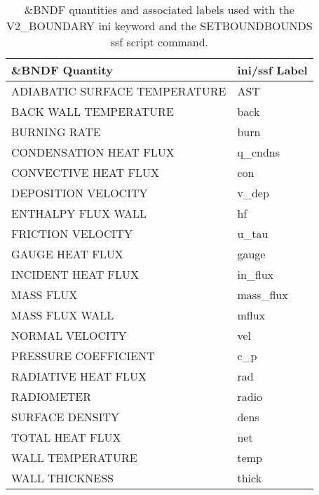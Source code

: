 \begin{table}[bph]
\begin{center}
\caption{\&BNDF quantities and associated labels used with the V2\_BOUNDARY ini keyword and the SETBOUNDBOUNDS ssf script command.}
\vspace{0.1in}
\begin{tabular}{|l|l|}
\hline
\&BNDF Quantity & ini/ssf Label \\ \hline
 ADIABATIC SURFACE TEMPERATURE  &   AST \\ \hline
 BACK WALL TEMPERATURE  &   back \\ \hline
 BURNING RATE  &   burn \\ \hline
 CONDENSATION HEAT FLUX  &   q\_cndns \\ \hline
 CONVECTIVE HEAT FLUX  &   con \\ \hline
 DEPOSITION VELOCITY  &   v\_dep \\ \hline
 ENTHALPY FLUX WALL  &   hf \\ \hline
 FRICTION VELOCITY  &   u\_tau \\ \hline
 GAUGE HEAT FLUX  &   gauge \\ \hline
 INCIDENT HEAT FLUX  &   in\_flux \\ \hline
 MASS FLUX  &   mass\_flux \\ \hline
 MASS FLUX WALL  &   mflux \\ \hline
 NORMAL VELOCITY  &   vel \\ \hline
 PRESSURE COEFFICIENT  &   c\_p \\ \hline
 RADIATIVE HEAT FLUX  &   rad \\ \hline
 RADIOMETER  &   radio \\ \hline
 SURFACE DENSITY  &   dens \\ \hline
 TOTAL HEAT FLUX  &   net \\ \hline
 WALL TEMPERATURE  &   temp \\ \hline
 WALL THICKNESS  &   thick \\ \hline
\end{tabular}
\label{tabBNDF}
\end{center}
\end{table}
